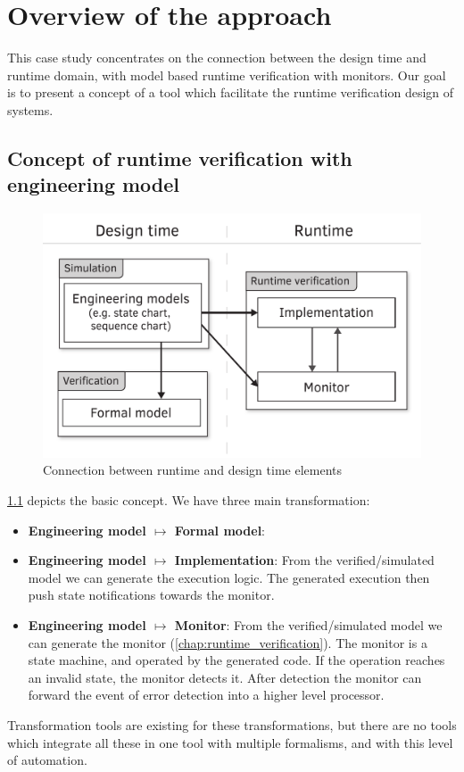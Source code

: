 \chapter{Overview of the approach}
\label{chap:overview}

This case study concentrates on the connection between the design time and runtime domain, with model based runtime verification with monitors. Our goal is to present a concept of a tool which facilitate the runtime verification design of systems.

\section{Concept of runtime verification with engineering model}

\begin{figure}[h]
	\centering
	\includegraphics[width=0.6\linewidth]{include/figures/chapter_3/abstract_overview}
	\caption{Connection between runtime and design time elements}
	\label{fig:overview:abstract_overview}
\end{figure}

\cref{fig:overview:abstract_overview} depicts the basic concept. We have three main transformation:
\begin{itemize}
	\item \textbf{Engineering model $\mapsto$ Formal model}: 
	\item \textbf{Engineering model $\mapsto$ Implementation}: From the verified/simulated model we can generate the execution logic. The generated execution then push state notifications towards the monitor.
	\item \textbf{Engineering model $\mapsto$ Monitor}: From the verified/simulated model we can generate the monitor (\vref{chap:runtime_verification}). The monitor is a state machine, and operated by the generated code. If the operation reaches an invalid state, the monitor detects it. After detection the monitor can forward the event of error detection into a higher level processor.
\end{itemize}
Transformation tools are existing for these transformations, but there are no tools which integrate all these in one tool with multiple formalisms, and with this level of automation.
\\[1ex]

